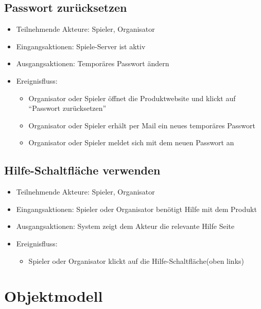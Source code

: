 \documentclass[a4paper]{scrreprt}
\begin{document}
    \subsection{Passwort zurücksetzen}
    \begin{itemize}
        \item Teilnehmende Akteure: \Gls{Spieler}, \Gls{Organisator}
        \item Eingangsaktionen: Spiele-Server ist aktiv
        \item Ausgangsaktionen: Temporäres Passwort ändern
        \item Ereignisfluss:
        \begin{itemize}
            \item Organisator oder Spieler öffnet die Produktwebsite und klickt auf \enquote{Passwort zurücksetzen}
            \item Organisator oder Spieler erhält per Mail ein neues temporäres Passwort
            \item Organisator oder Spieler meldet sich mit dem neuen Passwort an
        \end{itemize}
    \end{itemize}
       \subsection{Hilfe-Schaltfläche verwenden}
    \begin{itemize}
        \item Teilnehmende Akteure: \Gls{Spieler}, \Gls{Organisator}
        \item Eingangsaktionen: Spieler oder Organisator benötigt Hilfe mit dem Produkt
        \item Ausgangsaktionen: System zeigt dem Akteur die relevante Hilfe Seite
        \item Ereignisfluss:
            \begin{itemize}
                \item Spieler oder Organisator klickt auf die Hilfe-Schaltfläche(oben links)
            \end{itemize}
    \end{itemize}


        \section{Objektmodell}
\end{document}
